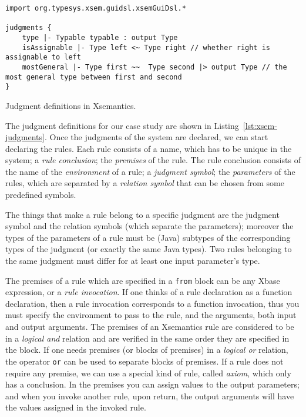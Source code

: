 \begin{listing}[tb]
\begin{lstlisting}[language=xsemantics]
import org.typesys.xsem.guidsl.xsemGuiDsl.*

judgments {
	type |- Typable typable : output Type 
	isAssignable |- Type left <~ Type right // whether right is assignable to left
	mostGeneral |- Type first ~~  Type second |> output Type // the most general type between first and second
}
\end{lstlisting}
\caption{Judgment definitions in Xsemantics.}
\label{lst:xsem-judgments}
\end{listing}

The judgment definitions for our case study are shown in
Listing~\ref{lst:xsem-judgments}.
Once the judgments of the system are declared, we can start declaring the rules.
 Each rule consists of a name, which has to be unique in the system; a
\textit{rule conclusion}; the \textit{premises} of the rule.  The rule
conclusion consists of the name of the \textit{environment} of a rule; a
\textit{judgment symbol}; the \textit{parameters} of the rules, which are
separated by a \textit{relation symbol} that can be chosen from some predefined
symbols.

The things that make a rule belong to a specific judgment are the judgment
symbol and the relation symbols (which separate the parameters); moreover the
types of the parameters of a rule must be (Java) subtypes of the corresponding types
of the judgment (or exactly the same Java types).  Two rules belonging to the
same judgment must differ for at least one input parameter's type.

The premises of a rule which are specified in a \verb|from| block can be any
Xbase expression, or a \emph{rule invocation}.  If one thinks of a rule
declaration as a function declaration, then a rule invocation corresponds to a
function invocation, thus you must specify the environment to pass to the rule,
and the arguments, both input and output arguments.
The premises of an Xsemantics rule are considered to be in a \emph{logical and}
relation and are verified in the same order they are specified in the block.
If one needs premises (or blocks of premises) in a \emph{logical or} relation,
the operator \verb|or| can be used to separate blocks of premises.
If a rule does not require any premise, we can use a special kind of rule,
called \textit{axiom}, which only has a conclusion.
In the premises you can assign values to the output parameters; and when you
invoke another rule, upon return, the output arguments will have the values
assigned in the invoked rule.

